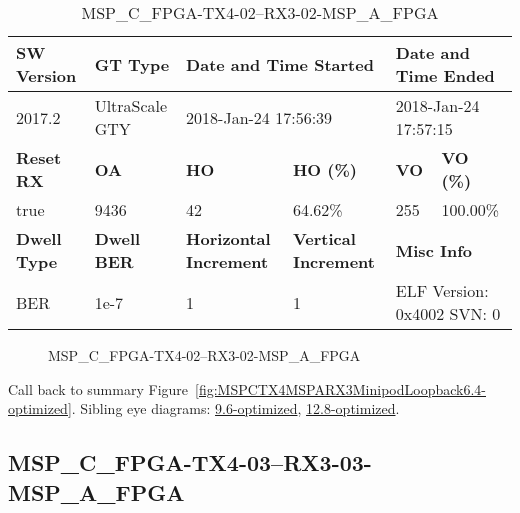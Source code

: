 \begin{table}[h]
\centering
\caption{MSP\_C\_FPGA-TX4-02--RX3-02-MSP\_A\_FPGA}
\label{tab:MSPCFPGATX402RX302MSPAFPGA6.4-optimized}
\begin{tabular}{@{}|l|l|l|l|l|l|@{}}
\toprule
\textbf{SW Version}                & \textbf{GT Type}   & \multicolumn{2}{l|}{\textbf{Date and Time Started}}            & \multicolumn{2}{l|}{\textbf{Date and Time Ended}}        \\ \midrule
2017.2                       & UltraScale GTY          & \multicolumn{2}{l|}{2018-Jan-24 17:56:39}                   & \multicolumn{2}{l|}{2018-Jan-24 17:57:15}               \\ \midrule
\textbf{Reset RX}                  & \textbf{OA} & \textbf{HO}   & \textbf{HO (\%)} & \textbf{VO} & \textbf{VO (\%)} \\ \midrule
true & 9436        & 42          & 64.62\%        & 255        & 100.00\%       \\ \midrule
\textbf{Dwell Type}                & \textbf{Dwell BER} & \textbf{Horizontal Increment} & \textbf{Vertical Increment}    & \multicolumn{2}{l|}{\textbf{Misc Info}}                  \\ \midrule
BER                            & 1e-7        & 1        & 1           & \multicolumn{2}{l|}{ELF Version: 0x4002 SVN: 0}                         \\ \bottomrule
\end{tabular}
\end{table}

\begin{figure}[h]
\caption{MSP\_C\_FPGA-TX4-02--RX3-02-MSP\_A\_FPGA} \label{fig:MSPCFPGATX402RX302MSPAFPGA6.4-optimized}
\end{figure}

Call back to summary Figure~\ref{fig:MSPCTX4MSPARX3MinipodLoopback6.4-optimized}.
Sibling eye diagrams: \hyperref[sec:MSPCFPGATX402RX302MSPAFPGA9.6-optimized]{9.6-optimized}, \hyperref[sec:MSPCFPGATX402RX302MSPAFPGA12.8-optimized]{12.8-optimized}.

\clearpage
\newpage


\subsection{MSP\_C\_FPGA-TX4-03--RX3-03-MSP\_A\_FPGA}\label{sec:MSPCFPGATX403RX303MSPAFPGA6.4-optimized}

